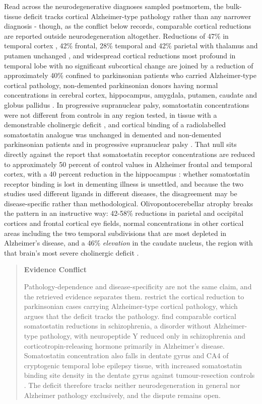 \documentclass[11pt]{article}
\begin{document}
Read across the neurodegenerative diagnoses sampled postmortem, the bulk-tissue deficit tracks cortical Alzheimer-type pathology rather than any narrower diagnosis - though, as the conflict below records, comparable cortical reductions are reported outside neurodegeneration altogether. Reductions of 47\% in temporal cortex \citep{Rossor1980}, 42\% frontal, 28\% temporal and 42\% parietal with thalamus and putamen unchanged \citep{Reinikainen1987}, and widespread cortical reductions most profound in temporal lobe with no significant subcortical change \citep{Beal1986a} are joined by a reduction of approximately 40\% confined to parkinsonian patients who carried Alzheimer-type cortical pathology, non-demented parkinsonian donors having normal concentrations in cerebral cortex, hippocampus, amygdala, putamen, caudate and globus pallidus \citep{Beal1986d}. In progressive supranuclear palsy, somatostatin concentrations were not different from controls in any region tested, in tissue with a demonstrable cholinergic deficit \citep{Epelbaum1987}, and cortical binding of a radiolabelled somatostatin analogue was unchanged in demented and non-demented parkinsonian patients and in progressive supranuclear palsy \citep{Epelbaum1988}. That null sits directly against the report that somatostatin receptor concentrations are reduced to approximately 50 percent of control values in Alzheimer frontal and temporal cortex, with a 40 percent reduction in the hippocampus \citep{Beal1985b}: whether somatostatin receptor binding is lost in dementing illness is unsettled, and because the two studies used different ligands in different diseases, the disagreement may be disease-specific rather than methodological. Olivopontocerebellar atrophy breaks the pattern in an instructive way: 42-58\% reductions in parietal and occipital cortices and frontal cortical eye fields, normal concentrations in other cortical areas including the two temporal subdivisions that are most depleted in Alzheimer's disease, and a 46\% \emph{elevation} in the caudate nucleus, the region with that brain's most severe cholinergic deficit \citep{Kish1993}.

\begin{quote}
\noindent\textbf{Evidence Conflict}\par
Pathology-dependence and disease-specificity are not the same claim, and the retrieved evidence separates them. \citet{Beal1986d} restrict the cortical reduction to parkinsonian cases carrying Alzheimer-type cortical pathology, which argues that the deficit tracks the pathology. \citet{Gabriel1996} find comparable cortical somatostatin reductions in schizophrenia, a disorder without Alzheimer-type pathology, with neuropeptide Y reduced only in schizophrenia and corticotropin-releasing hormone primarily in Alzheimer's disease. Somatostatin concentration also falls in dentate gyrus and CA4 of cryptogenic temporal lobe epilepsy tissue, with increased somatostatin binding site density in the dentate gyrus against tumour-resection controls \citep{Robbins1991}. The deficit therefore tracks neither neurodegeneration in general nor Alzheimer pathology exclusively, and the dispute remains open.

\end{quote}
\end{document}
